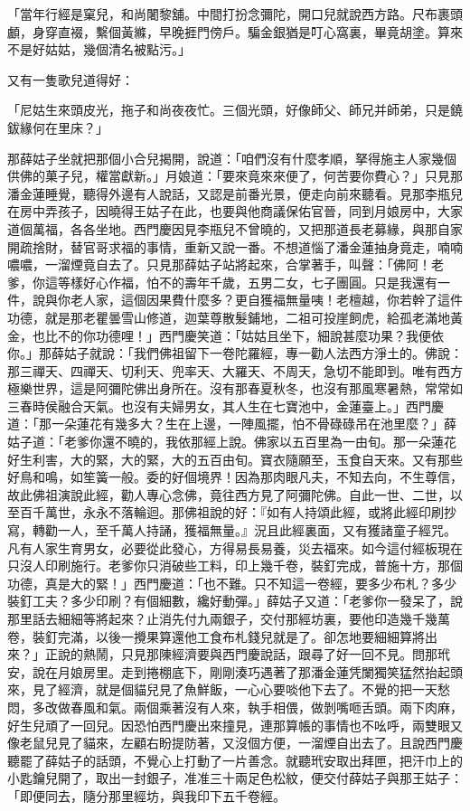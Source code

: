 \begin{showcontents}{}
「當年行經是窠兒，和尚闍黎舖。中間打扮念彌陀，開口兒就說西方路。尺布裹頭顱，身穿直裰，繫個黃縧，早晚捱門傍戶。騙金銀猶是叮心窩裏，畢竟胡塗。算來不是好姑姑，幾個清名被點污。」

又有一隻歌兒道得好：

「尼姑生來頭皮光，拖子和尚夜夜忙。三個光頭，好像師父、師兄并師弟，只是鐃鈸緣何在里床？」

那薛姑子坐就把那個小合兒揭開，說道：「咱們沒有什麼孝順，拏得施主人家幾個供佛的菓子兒，權當獻新。」月娘道：「要來竟來來便了，何苦要你費心？」只見那潘金蓮睡覺，聽得外邊有人說話，又認是前番光景，便走向前來聽看。見那李瓶兒在房中弄孩子，因曉得王姑子在此，也要與他商議保佑官晉，同到月娘房中，大家道個萬福，各各坐地。西門慶因見李瓶兒不曾曉的，又把那道長老募緣，與那自家開疏捨財，替官哥求福的事情，重新又說一番。不想道惱了潘金蓮抽身竟走，喃喃噥噥，一溜煙竟自去了。只見那薛姑子站將起來，合掌著手，叫聲：「佛阿！老爹，你這等樣好心作福，怕不的壽年千歲，五男二女，七子團圓。只是我還有一件，說與你老人家，這個因果費什麼多？更自獲福無量咦！老檀越，你若幹了這件功德，就是那老瞿曇雪山修道，迦葉尊散髮鋪地，二祖可投崖飼虎，給孤老滿地黃金，也比不的你功德哩！」西門慶笑道：「姑姑且坐下，細說甚麼功果？我便依你。」那薛姑子就說：「我們佛祖留下一卷陀羅經，專一勸人法西方淨土的。佛說：那三禪天、四禪天、切利天、兜率天、大羅天、不周天，急切不能即到。唯有西方極樂世界，這是阿彌陀佛出身所在。沒有那春夏秋冬，也沒有那風寒暑熱，常常如三春時侯融合天氣。也沒有夫婦男女，其人生在七寶池中，金蓮臺上。」西門慶道：「那一朵蓮花有幾多大？生在上邊，一陣風擺，怕不骨碌碌吊在池里麼？」薛姑子道：「老爹你還不曉的，我依那經上說。佛家以五百里為一由旬。那一朵蓮花好生利害，大的緊，大的緊，大的五百由旬。寶衣隨願至，玉食自天來。又有那些好鳥和鳴，如笙簧一般。委的好個境界！因為那肉眼凡夫，不知去向，不生尊信，故此佛祖演說此經，勸人專心念佛，竟往西方見了阿彌陀佛。自此一世、二世，以至百千萬世，永永不落輪迴。那佛祖說的好：『如有人持頌此經，或將此經印刷抄寫，轉勸一人，至千萬人持誦，獲福無量。』況且此經裏面，又有獲諸童子經咒。凡有人家生育男女，必要從此發心，方得易長易養，災去福來。如今這付經板現在只沒人印刷施行。老爹你只消破些工料，印上幾千卷，裝釘完成，普施十方，那個功德，真是大的緊！」西門慶道：「也不難。只不知這一卷經，要多少布札？多少裝釘工夫？多少印刷？有個細數，纔好動彈。」薛姑子又道：「老爹你一發呆了，說那里話去細細等將起來？止消先付九兩銀子，交付那經坊裏，要他印造幾千幾萬卷，裝釘完滿，以後一攪果算還他工食布札錢兒就是了。卻怎地要細細算將出來？」正說的熱鬧，只見那陳經濟要與西門慶說話，跟尋了好一回不見。問那玳安，說在月娘房里。走到捲棚底下，剛剛湊巧遇著了那潘金蓮凭闌獨笑猛然抬起頭來，見了經濟，就是個貓兒見了魚鮮飯，一心心要啖他下去了。不覺的把一天愁悶，多改做春風和氣。兩個乘著沒有人來，執手相偎，做剝嘴咂舌頭。兩下肉麻，好生兒頑了一回兒。因恐怕西門慶出來撞見，連那算帳的事情也不吆呼，兩雙眼又像老鼠兒見了貓來，左顧右盼提防著，又沒個方便，一溜煙自出去了。且說西門慶聽罷了薛姑子的話頭，不覺心上打動了一片善念。就聽玳安取出拜匣，把汗巾上的小匙鑰兒開了，取出一封銀子，准准三十兩足色松紋，便交付薛姑子與那王姑子：「即便同去，隨分那里經坊，與我印下五千卷經。
\end{showcontents}
